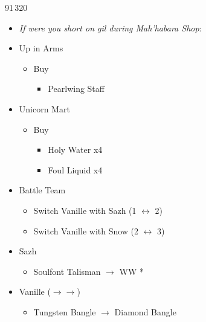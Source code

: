\begin{paracol}{2}
\begin{shop}{91\,320}
\begin{itemize}
\begin{itemize}
\begin{itemize}
				            \end{itemize}
			      \end{itemize}
			\item \textit{If were you short on gil during Mah'habara Shop}:
			\item Up in Arms
			      \begin{itemize}
				      \item Buy
				            \begin{itemize}
					            \item Pearlwing Staff
				            \end{itemize}
			      \end{itemize}
			\item Unicorn Mart
			      \begin{itemize}
				      \item Buy
				            \begin{itemize}
					            \item Holy Water x4
					            \item Foul Liquid x4
				            \end{itemize}
			      \end{itemize}
		\end{itemize}
	\end{shop}
	\switchcolumn*
	\begin{menu}
		\begin{itemize}
			\paradigm
			\begin{itemize}
				\item Battle Team
				      \begin{itemize}
					      \item Switch Vanille with Sazh (1 $\leftrightarrow$ 2)
					      \item Switch Vanille with Snow (2 $\leftrightarrow$ 3)
				      \end{itemize}
			\end{itemize}
			\equip
			\begin{itemize}
				\item Sazh
				      \begin{itemize}
					      \item Soulfont Talisman $\rightarrow$ WW *
				      \end{itemize}
				\item Vanille ($\rightarrow\rightarrow$)
				      \begin{itemize}
					      \item Tungsten Bangle $\rightarrow$ Diamond Bangle

\end{itemize}
\end{itemize}
\end{itemize}
\end{menu}
\end{paracol}

